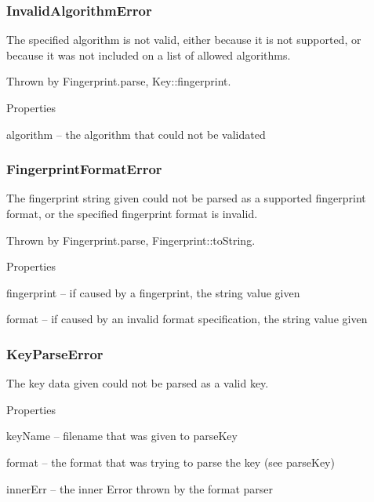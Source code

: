 \subsubsection*{{\ttfamily Invalid\+Algorithm\+Error}}

The specified algorithm is not valid, either because it is not supported, or because it was not included on a list of allowed algorithms.

Thrown by {\ttfamily Fingerprint.\+parse}, {\ttfamily Key\+::fingerprint}.

Properties


\begin{DoxyItemize}
\item {\ttfamily algorithm} -- the algorithm that could not be validated
\end{DoxyItemize}

\subsubsection*{{\ttfamily Fingerprint\+Format\+Error}}

The fingerprint string given could not be parsed as a supported fingerprint format, or the specified fingerprint format is invalid.

Thrown by {\ttfamily Fingerprint.\+parse}, {\ttfamily Fingerprint\+::to\+String}.

Properties


\begin{DoxyItemize}
\item {\ttfamily fingerprint} -- if caused by a fingerprint, the string value given
\item {\ttfamily format} -- if caused by an invalid format specification, the string value given
\end{DoxyItemize}

\subsubsection*{{\ttfamily Key\+Parse\+Error}}

The key data given could not be parsed as a valid key.

Properties


\begin{DoxyItemize}
\item {\ttfamily key\+Name} -- {\ttfamily filename} that was given to {\ttfamily parse\+Key}
\item {\ttfamily format} -- the {\ttfamily format} that was trying to parse the key (see {\ttfamily parse\+Key})
\item {\ttfamily inner\+Err} -- the inner Error thrown by the format parser
\end{DoxyItemize}

